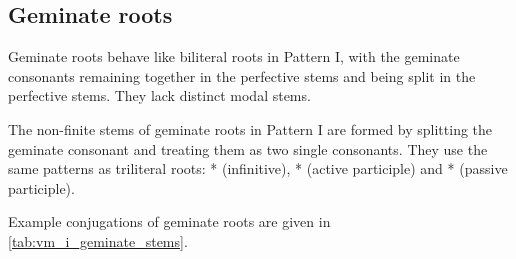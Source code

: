 \documentclass[grammar]{subfiles}
\begin{document}
\subsection{Geminate roots}
\label{ssec:vm_i_geminate_roots}

Geminate roots behave like biliteral roots in Pattern I, with the geminate
consonants remaining together in the perfective stems and being split in the
perfective stems.  They lack distinct modal stems. 

The non-finite stems of geminate roots in Pattern I are formed by splitting the
geminate consonant and treating them as two single consonants.  They use the
same patterns as triliteral roots:  * (infinitive), *
(active participle) and * (passive participle). 

Example conjugations of geminate roots are given in
\cref{tab:vm_i_geminate_stems}.


\begin{table}[h!]\small\capstart
  \centering
  \\
  \caption{Pattern I geminate stems \label{tab:vm_i_geminate_stems}}
\end{table}
\end{document}
